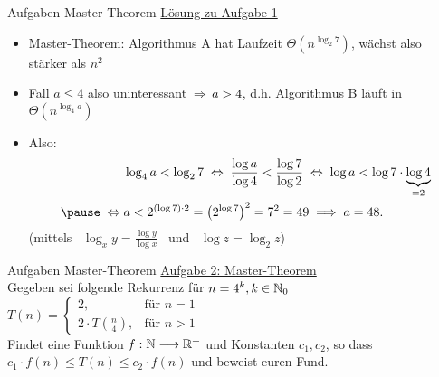 \begin{frame}{Aufgaben Master-Theorem}
	\underline{Lösung zu Aufgabe 1} \\
	\begin{itemize}
		\item Master-Theorem: Algorithmus A hat Laufzeit $\Theta(n^{\log _{2}7})$, wächst also stärker als $n^2$
		\pause
		\item Fall $a \leq 4$ also uninteressant $\impl a > 4$, d.h. Algorithmus B läuft in $\Theta(n^{\log _{4}a})$ \\
		\pause 
		\item Also: 
		\begin{align*}
		&\log_{4}a < \log_{2}7 \gdw \frac{\log a}{\log 4} < \frac{\log 7}{\log 2} \gdw \log a < \log 7 \cdot \underbrace{\log 4}_{= 2}  \\ \pause
		\gdw &a < 2^{(\log 7) \cdot 2} = \left(2^{\log 7}\right)^{2} = 7^2 = 49 \Impl a = 48.
		\end{align*}
		(mittels \ $\log_x y = \frac{\log y}{\log x}$ \ und \ $\log z = \log_2 z$)
	\end{itemize}
\end{frame}


\begin{frame}{Aufgaben Master-Theorem}
	\underline{Aufgabe 2: Master-Theorem} \\
	Gegeben sei folgende Rekurrenz für $n = 4^k, k \in \mathbb{N}_0$ \\[0,5cm]
	\begin{math}
	T(n) = 
	\begin{cases}
	2,                       & \text{für } n = 1 \\
	2 \cdot T(\frac{n}{4}),  & \text{für } n > 1
	\end{cases}
	\end{math} \\[0,5cm]
	Findet eine Funktion $f : \mathbb{N} \longrightarrow \mathbb{R}^+$ und Konstanten $c_1, c_2$, so dass $c_1 \cdot f(n) \leq T(n) \leq c_2 \cdot f(n)$ und beweist euren Fund.
\end{frame}

